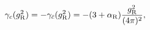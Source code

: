 \begin{equation}
\gamma_c(g_{\rm R}^2) = - \gamma_{\bar{c}}(g_{\rm R}^2)
 =-(3+\alpha_{\rm R})
   \frac{g_{\rm R}^2}{(4\pi)^2},
\end{equation}

